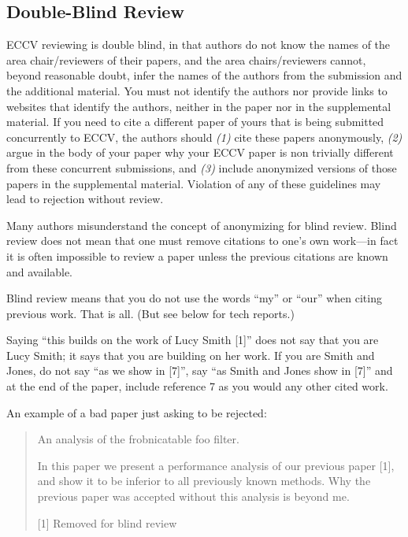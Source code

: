 \documentclass[runningheads]{llncs}
\begin{document}
\subsection{Double-Blind Review}
\label{sec:blind}
ECCV reviewing is double blind, in that authors do not know the names of the area chair/reviewers of their papers, and the area chairs/reviewers cannot, beyond reasonable doubt, infer the names of the authors from the submission and the additional material. 
You must not identify the authors nor provide links to websites that identify the authors, neither in the paper nor in the supplemental material.
If you need to cite a different paper of yours that is being submitted concurrently to ECCV, the authors should \emph{(1)} cite these papers anonymously, \emph{(2)} argue in the body of your paper why your ECCV paper is non trivially different from these concurrent submissions, and \emph{(3)} include anonymized versions of those papers in the supplemental material.
Violation of any of these guidelines may lead to rejection without review. 

Many authors misunderstand the concept of anonymizing for blind review.
Blind review does not mean that one must remove citations to one's own work---in fact it is often impossible to review a paper unless the previous citations are known and available.

Blind review means that you do not use the words ``my'' or ``our'' when citing previous work.
That is all.
(But see below for tech reports.)

Saying ``this builds on the work of Lucy Smith [1]'' does not say that you are Lucy Smith;
it says that you are building on her work.
If you are Smith and Jones, do not say ``as we show in [7]'', say ``as Smith and Jones show in [7]'' and at the end of the paper, include reference 7 as you would any other cited work.

An example of a bad paper just asking to be rejected:
\begin{quote}
  \begin{center}
      An analysis of the frobnicatable foo filter.
  \end{center}

   In this paper we present a performance analysis of our previous paper [1], and show it to be inferior to all previously known methods.
   Why the previous paper was accepted without this analysis is beyond me.

   [1] Removed for blind review
\end{quote}
\end{document}
